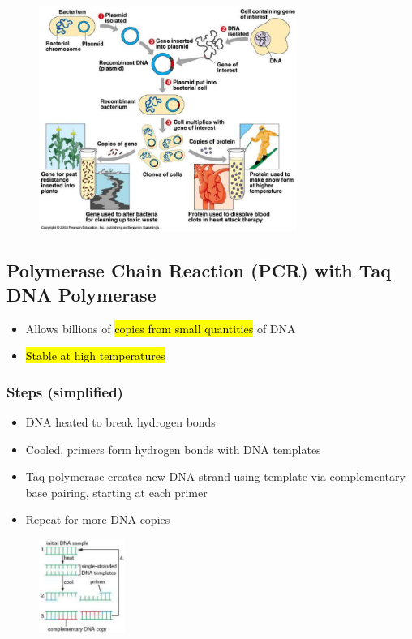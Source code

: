 \documentclass[a4paper,12pt]{article}
\begin{document}
\begin{figure}[H]
    \centering
    \includegraphics[width=0.75\textwidth]{plasmid}
\end{figure}

\subsection{Polymerase Chain Reaction (PCR) with Taq DNA Polymerase}
\begin{itemize}
    \item{Allows billions of \hl{copies from small quantities} of DNA}
    \item{\hl{Stable at high temperatures}}
\end{itemize}

\subsubsection{Steps (simplified)}
\begin{itemize}
    \item{DNA heated to break hydrogen bonds}
    \item{Cooled, primers form hydrogen bonds with DNA templates}
    \item{Taq polymerase creates new DNA strand using template via complementary base pairing, starting at each primer}
    \item{Repeat for more DNA copies}
\end{itemize}

\begin{figure}[H]
    \centering
    \includegraphics[width=0.25\textwidth]{taq}
\end{figure}
\end{document}
